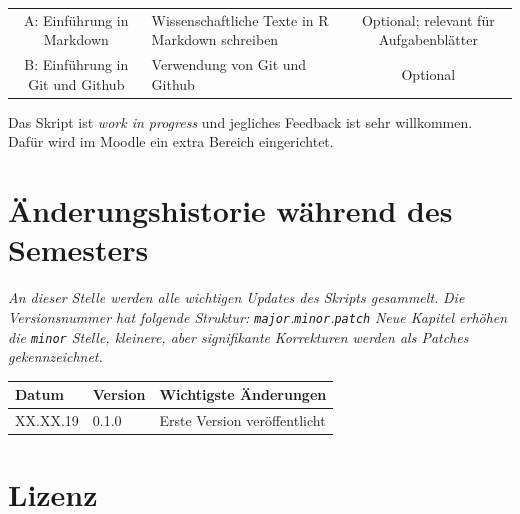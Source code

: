 \documentclass[]{tufte-book}
\begin{document}
\begin{longtable}[]{@{}clc@{}}
\begin{minipage}[t]{0.24\columnwidth}
A: Einführung in Markdown\strut
\end{minipage} & \begin{minipage}[t]{0.34\columnwidth}\raggedright\strut
Wissenschaftliche Texte in R Markdown schreiben\strut
\end{minipage} & \begin{minipage}[t]{0.34\columnwidth}\centering\strut
Optional; relevant für Aufgabenblätter\strut
\end{minipage}\tabularnewline
\begin{minipage}[t]{0.24\columnwidth}\centering\strut
B: Einführung in Git und Github\strut
\end{minipage} & \begin{minipage}[t]{0.34\columnwidth}\raggedright\strut
Verwendung von Git und Github\strut
\end{minipage} & \begin{minipage}[t]{0.34\columnwidth}\centering\strut
Optional\strut
\end{minipage}\tabularnewline
\bottomrule
\end{longtable}

Das Skript ist \emph{work in progress} und jegliches Feedback ist sehr
willkommen. Dafür wird im Moodle ein extra Bereich eingerichtet.

\section*{Änderungshistorie während des
Semesters}\label{anderungshistorie-wahrend-des-semesters}

\emph{An dieser Stelle werden alle wichtigen Updates des Skripts
gesammelt.} \emph{Die Versionsnummer hat folgende Struktur:
\texttt{major}.\texttt{minor}.\texttt{patch}} \emph{Neue Kapitel erhöhen
die \texttt{minor} Stelle, kleinere, aber signifikante}
\emph{Korrekturen werden als Patches gekennzeichnet.}

\begin{longtable}[]{@{}lll@{}}
\toprule
Datum & Version & Wichtigste Änderungen\tabularnewline
\midrule
\endhead
XX.XX.19 & 0.1.0 & Erste Version veröffentlicht\tabularnewline
\bottomrule
\end{longtable}

\section*{Lizenz}\label{lizenz}
\end{document}
